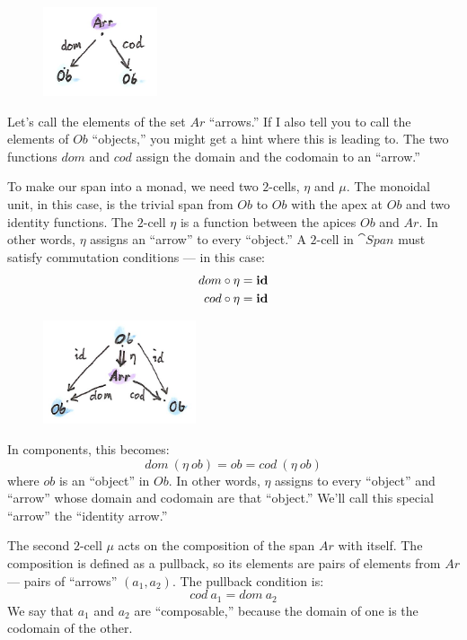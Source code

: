 \begin{figure}[H]
\centering
\includegraphics[width=0.3\textwidth]{images/spanmonad.png}
\end{figure}

\noindent
Let's call the elements of the set $Ar$ ``arrows.'' If I also
tell you to call the elements of $Ob$ ``objects,'' you might get
a hint where this is leading to. The two functions $dom$ and
$cod$ assign the domain and the codomain to an ``arrow.''

To make our span into a monad, we need two $2$-cells, $\eta$ and
$\mu$. The monoidal unit, in this case, is the trivial span from
$Ob$ to $Ob$ with the apex at $Ob$ and two identity
functions. The $2$-cell $\eta$ is a function between the apices
$Ob$ and $Ar$. In other words, $\eta$ assigns an
``arrow'' to every ``object.'' A $2$-cell in $\cat{Span}$ must satisfy
commutation conditions --- in this case:
\begin{align*}
dom &\circ \eta = \mathbf{id} \\
cod &\circ \eta = \mathbf{id}
\end{align*}

\begin{figure}[H]
\centering
\includegraphics[width=0.4\textwidth]{images/spanunit.png}
\end{figure}

\noindent
In components, this becomes:
\[dom\ (\eta\ ob) = ob = cod\ (\eta\ ob)\]
where $ob$ is an ``object'' in $Ob$. In other words,
$\eta$ assigns to every ``object'' and ``arrow'' whose domain and
codomain are that ``object.'' We'll call this special ``arrow'' the
``identity arrow.''

The second $2$-cell $\mu$ acts on the composition of the span
$Ar$ with itself. The composition is defined as a pullback, so
its elements are pairs of elements from $Ar$ --- pairs of
``arrows'' $(a_1, a_2)$. The pullback condition is:
\[cod\ a_1 = dom\ a_2\]
We say that $a_1$ and $a_2$ are ``composable,'' because the
domain of one is the codomain of the other.

